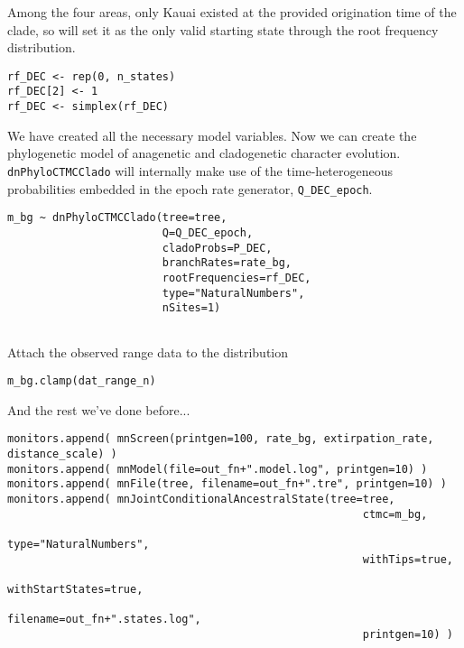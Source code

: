 Among the four areas, only Kauai existed at the provided origination time of the clade, so will set it as the only valid starting state through the root frequency distribution.

\begin{snugshade}
\begin{lstlisting}
rf_DEC <- rep(0, n_states)
rf_DEC[2] <- 1 
rf_DEC <- simplex(rf_DEC)
\end{lstlisting}
\end{snugshade}

We have created all the necessary model variables.
Now we can create the phylogenetic model of anagenetic and cladogenetic character evolution.
{\tt dnPhyloCTMCClado} will internally make use of the time-heterogeneous probabilities embedded in the epoch rate generator, {\tt Q\_DEC\_epoch}.
\begin{snugshade}
\begin{lstlisting}
m_bg ~ dnPhyloCTMCClado(tree=tree,
                        Q=Q_DEC_epoch,
                        cladoProbs=P_DEC,
                        branchRates=rate_bg,
                        rootFrequencies=rf_DEC,
                        type="NaturalNumbers",
                        nSites=1)
                  
\end{lstlisting}
\end{snugshade}

Attach the observed range data to the distribution

\begin{snugshade}
\begin{lstlisting}
m_bg.clamp(dat_range_n)
\end{lstlisting}
\end{snugshade}

And the rest we've done before...

\begin{snugshade}
\begin{lstlisting}
monitors.append( mnScreen(printgen=100, rate_bg, extirpation_rate, distance_scale) )
monitors.append( mnModel(file=out_fn+".model.log", printgen=10) )
monitors.append( mnFile(tree, filename=out_fn+".tre", printgen=10) )
monitors.append( mnJointConditionalAncestralState(tree=tree,
                                                       ctmc=m_bg,
                                                       type="NaturalNumbers",
                                                       withTips=true,
                                                       withStartStates=true,
                                                       filename=out_fn+".states.log",
                                                       printgen=10) )
                                                       
\end{lstlisting}
\end{snugshade}

